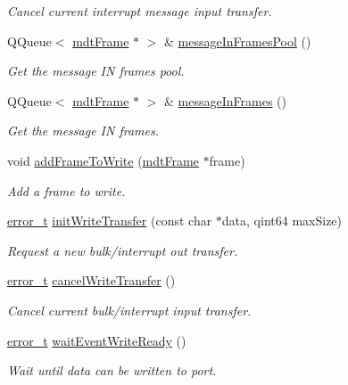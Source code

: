 \begin{DoxyCompactItemize}
\begin{DoxyCompactList}\small\item\em Cancel current interrupt message input transfer. \end{DoxyCompactList}\item 
QQueue$<$ \hyperlink{classmdt_frame}{mdtFrame} $\ast$ $>$ \& \hyperlink{classmdt_usb_port_a3ad4385983122fcaf6d2560b6bd43acf}{messageInFramesPool} ()
\begin{DoxyCompactList}\small\item\em Get the message IN frames pool. \end{DoxyCompactList}\item 
QQueue$<$ \hyperlink{classmdt_frame}{mdtFrame} $\ast$ $>$ \& \hyperlink{classmdt_usb_port_a3365431076a3197540cbc99278658bda}{messageInFrames} ()
\begin{DoxyCompactList}\small\item\em Get the message IN frames. \end{DoxyCompactList}\item 
void \hyperlink{classmdt_usb_port_a38200f806037e06988e73af246e8a494}{addFrameToWrite} (\hyperlink{classmdt_frame}{mdtFrame} $\ast$frame)
\begin{DoxyCompactList}\small\item\em Add a frame to write. \end{DoxyCompactList}\item 
\hyperlink{classmdt_abstract_port_ad4121bb930c95887e77f8bafa065a85e}{error\_\-t} \hyperlink{classmdt_usb_port_a3340dc3f53e857e39053988e4925fc97}{initWriteTransfer} (const char $\ast$data, qint64 maxSize)
\begin{DoxyCompactList}\small\item\em Request a new bulk/interrupt out transfer. \end{DoxyCompactList}\item 
\hyperlink{classmdt_abstract_port_ad4121bb930c95887e77f8bafa065a85e}{error\_\-t} \hyperlink{classmdt_usb_port_a7cbe1cd3649861aac5e6a14830f06cf9}{cancelWriteTransfer} ()
\begin{DoxyCompactList}\small\item\em Cancel current bulk/interrupt input transfer. \end{DoxyCompactList}\item 
\hyperlink{classmdt_abstract_port_ad4121bb930c95887e77f8bafa065a85e}{error\_\-t} \hyperlink{classmdt_usb_port_a3be875f6f10ae94fd3a94f925bb935e7}{waitEventWriteReady} ()
\begin{DoxyCompactList}\small\item\em Wait until data can be written to port. \end{DoxyCompactList}\item 

\end{DoxyCompactItemize}
